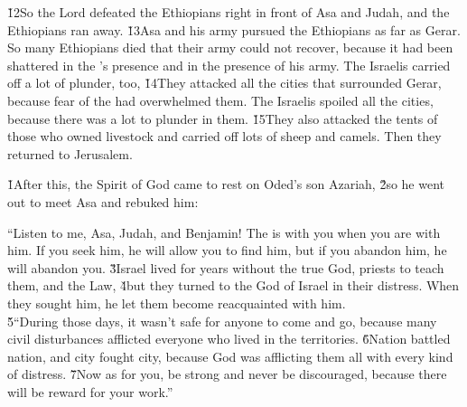 \v{12}So the Lord defeated the Ethiopians right in front of Asa and Judah, and the Ethiopians ran away. \v{13}Asa and his army pursued the Ethiopians as far as Gerar. So many Ethiopians died that their army could not recover, because it had been shattered in the 's presence and in the presence of his army. The Israelis carried off a lot of plunder, too, \v{14}They attacked all the cities that surrounded Gerar, because fear of the  had overwhelmed them. The Israelis spoiled all the cities, because there was a lot to plunder in them. \v{15}They also attacked the tents of those who owned livestock and carried off lots of sheep and camels. Then they returned to Jerusalem.

\v{1}After this, the Spirit of God came to rest on Oded's son Azariah, \v{2}so he went out to meet Asa and rebuked him:

\begin{poetry}
\poeml ``Listen to me, Asa, Judah, and Benjamin! The  is with you when you are with him. If you seek him, he will allow you to find him, but if you abandon him, he will abandon you. \v{3}Israel lived for years without the true God, priests to teach them, and the Law, \v{4}but they turned to the  God of Israel in their distress. When they sought him, he let them become reacquainted with him. \\
\poeml \v{5}``During those days, it wasn't safe for anyone to come and go, because many civil disturbances afflicted everyone who lived in the territories. \v{6}Nation battled nation, and city fought city, because God was afflicting them all with every kind of distress. \v{7}Now as for you, be strong and never be discouraged, because there will be reward for your work.''
\end{poetry}

